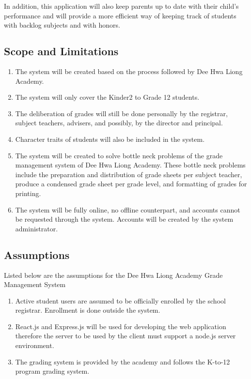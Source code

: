 \documentclass[11pt,a4paper,titlepage]{article}
\begin{document}
In addition, this application will also keep parents up to date with their child's performance and will provide a more efficient way of keeping track of students with backlog subjects and with honors.

\subsection{Scope and Limitations}
\begin{enumerate}
	\item The system will be created based on the process followed by Dee Hwa Liong Academy.
	\item The system will only cover the Kinder2 to Grade 12 students.
	\item The deliberation of grades will still be done personally by the registrar, subject teachers, advisers, and possibly, by the director and principal.
	\item Character traits of students will also be included in the system.
	\item The system will be created to solve bottle neck problems of the grade management system of Dee Hwa Liong Academy. These bottle neck problems include the preparation and distribution of grade sheets per subject teacher, produce a condensed grade sheet per grade level, and formatting of grades for printing.
	\item The system will be fully online, no offline counterpart, and accounts cannot be requested through the system. Accounts will be created by the system administrator.
\end{enumerate}

\subsection{Assumptions}
Listed below are the assumptions for the Dee Hwa Liong Academy Grade Management System
\begin{enumerate}
	\item Active student users are assumed to be officially enrolled by the school registrar. Enrollment is done outside the system.
	\item React.js and Express.js will be used for developing the web application therefore the server to be used by the client must support a node.js server environment.
	\item The grading system is provided by the academy and follows the K-to-12 program grading system.
\end{enumerate}
\end{document}
